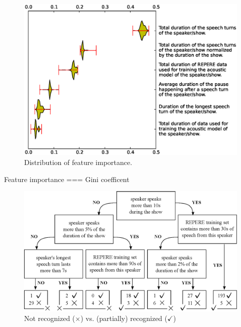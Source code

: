 \begin{figure}[t]
\centering
\includegraphics[width=\linewidth]{figures/violin.eps}
\caption{Distribution of feature importance.}
\label{fig:featureImportance}
\end{figure}


Feature importance === Gini coefficent~\cite{Breiman2001}


\begin{figure}[t]
\centering
\includegraphics[width=\linewidth]{figures/tree.eps}
\caption{Not recognized ($\times$) vs. (partially) recognized ($\checkmark$)}
\label{fig:tree}
\end{figure}
